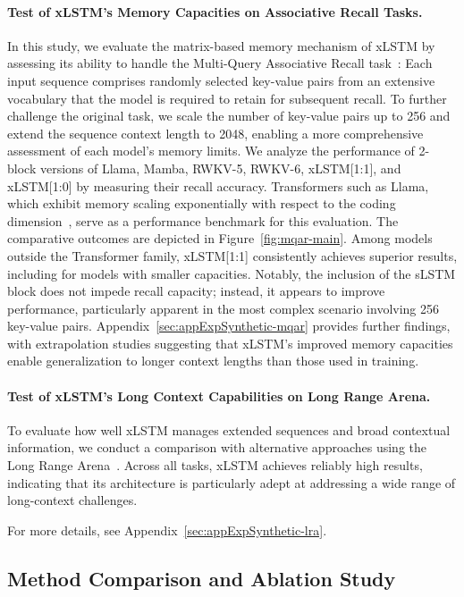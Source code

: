 \paragraph{Test of xLSTM's Memory Capacities on Associative Recall Tasks.} In this study, we evaluate the matrix-based memory mechanism of xLSTM by assessing its ability to handle the Multi-Query Associative Recall task~\citep{Arora:23arxiv}: Each input sequence comprises randomly selected key-value pairs from an extensive vocabulary that the model is required to retain for subsequent recall. To further challenge the original task, we scale the number of key-value pairs up to 256 and extend the sequence context length to 2048, enabling a more comprehensive assessment of each model's memory limits. We analyze the performance of 2-block versions of Llama, Mamba, RWKV-5, RWKV-6, xLSTM[1:1], and xLSTM[1:0] by measuring their recall accuracy. Transformers such as Llama, which exhibit memory scaling exponentially with respect to the coding dimension~\citep{Ramsauer:21}, serve as a performance benchmark for this evaluation. The comparative outcomes are depicted in Figure~\ref{fig:mqar-main}. 
Among models outside the Transformer family, xLSTM[1:1] consistently achieves superior results, including for models with smaller capacities. Notably, the inclusion of the sLSTM block does not impede recall capacity; instead, it appears to improve performance, particularly apparent in the most complex scenario involving 256 key-value pairs. Appendix~\ref{sec:appExpSynthetic-mqar} provides further findings, with extrapolation studies suggesting that xLSTM's improved memory capacities enable generalization to longer context lengths than those used in training.

\paragraph{Test of xLSTM's Long Context Capabilities on Long Range Arena.} To evaluate how well xLSTM manages extended sequences and broad contextual information, we conduct a comparison with alternative approaches using the Long Range Arena~\citep{Tay:21}. Across all tasks, xLSTM achieves reliably high results, indicating that its architecture is particularly adept at addressing a wide range of long-context challenges.

For more details, see Appendix~\ref{sec:appExpSynthetic-lra}.

\subsection{Method Comparison and Ablation Study}
\label{sec:ExpComparison}

